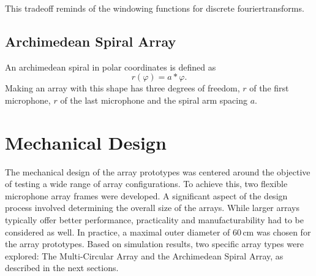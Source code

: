 This tradeoff reminds of the windowing functions for discrete
fouriertransforms. 

\subsection{Archimedean Spiral Array}
An archimedean spiral in polar coordinates is defined as
\begin{equation}
	r(\varphi) = a * \varphi.
\end{equation}
Making an array with this shape has three degrees of freedom,
$r$ of the first microphone, $r$ of the last microphone and the 
spiral arm spacing $a$. 



\newpage
\section{Mechanical Design}
The mechanical design of the array prototypes was centered around the objective of testing a wide range of array configurations.
To achieve this, two flexible microphone array frames were developed.
A significant aspect of the design process involved determining the overall size of the arrays.
While larger arrays typically offer better performance, practicality and manufacturability had to be considered as well.
In practice, a maximal outer diameter of 60\,cm was chosen for the array prototypes.
Based on simulation results, two specific array types were explored: The Multi-Circular Array and the Archimedean Spiral Array, as described in the next sections.

